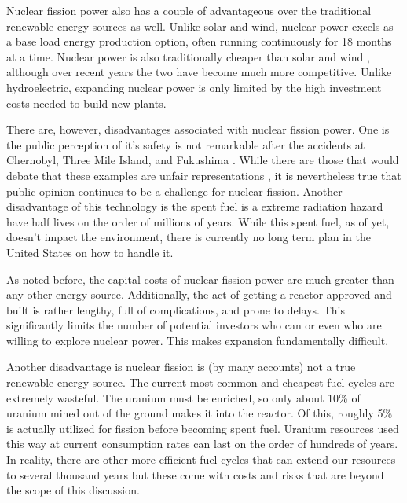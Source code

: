 		Nuclear fission power also has a couple of advantageous over the traditional renewable energy sources as well. Unlike solar and wind, nuclear power excels as a base load energy production option, often running continuously for 18 months at a time. \cite{bibid} Nuclear power is also traditionally cheaper than solar and wind \cite{bibid}, although over recent years the two have become much more competitive. \cite{bibid} Unlike hydroelectric, expanding nuclear power is only limited by the high investment costs needed to build new plants. 
		
		There are, however, disadvantages associated with nuclear fission power. One is the public perception of it's safety is not remarkable after the accidents at Chernobyl, \cite{bibid} Three Mile Island, \cite{bibid} and Fukushima \cite{bibid}. While there are those that would debate that these examples are unfair representations \cite{bibid}, it is nevertheless true that public opinion continues to be a challenge for nuclear fission. Another disadvantage of this technology is the spent fuel is a extreme radiation hazard have half lives on the order of millions of years. \cite{bibid} While this spent fuel, as of yet, doesn't impact the environment, there is currently no long term plan in the United States on how to handle it. \cite{bibid} 
		
		As noted before, the capital costs of nuclear fission power are much greater than any other energy source. \cite{bibid} Additionally, the act of getting a reactor approved and built is rather lengthy, full of complications, and prone to delays. \cite{bibid} This significantly limits the number of potential investors who can or even who are willing to explore nuclear power. This makes expansion fundamentally difficult. 
		
		Another disadvantage is nuclear fission is (by many accounts) not a true renewable energy source. \cite{bibid} The current most common and cheapest fuel cycles are extremely wasteful. The uranium must be enriched, so only about 10\% of uranium mined out of the ground makes it into the reactor. Of this, roughly 5\% is actually utilized for fission before becoming spent fuel. \cite{https://www.world-nuclear.org/information-library/nuclear-fuel-cycle/introduction/nuclear-fuel-cycle-overview.aspx} Uranium resources used this way at current consumption rates can last on the order of hundreds of years. \cite{bibid} In reality, there are other more efficient fuel cycles that can extend our resources to several thousand years but these come with costs and risks that are beyond the scope of this discussion. \cite{bibid}
		
